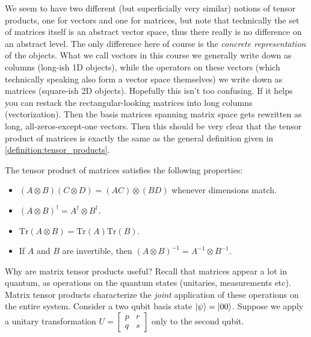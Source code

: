 \begin{remark}
    We seem to have two different (but superficially very similar) notions of tensor products, one for vectors and one for matrices, but note that technically the set of matrices itself is an abstract vector space, thus there really is no difference on an abstract level. The only difference here of course is the \textit{concrete representation} of the objects. What we call vectors in this course we generally write down as columns (long-ish 1D objects), while the operators on these vectors (which technically speaking also form a vector space themselves) we write down as matrices (square-ish 2D objects). Hopefully this isn't too confusing. If it helps you can restack the rectangular-looking matrices into long columns (vectorization). Then the basis matrices spanning matrix space gets rewritten as long, all-zeros-except-one vectors. Then this should be very clear that the tensor product of matrices is exactly the same as the general definition given in \cref{definition:tensor_products}.
\end{remark}
 

\begin{proposition}
The tensor product of matrices satisfies the following properties:
\begin{itemize}
    \item $(A \otimes B)(C \otimes D) = (AC) \otimes (BD)$ whenever dimensions match.
    \item $(A \otimes B)^\dagger = A^\dagger \otimes B^\dagger$.
    \item $\mathrm{Tr}(A \otimes B) = \mathrm{Tr}(A)\mathrm{Tr}(B)$.
    \item If $A$ and $B$ are invertible, then $(A \otimes B)^{-1} = A^{-1} \otimes B^{-1}$.
\end{itemize}
\end{proposition}

Why are matrix tensor products useful? Recall that matrices appear a lot in quantum, as operations on the quantum states (unitaries, measurements etc). Matrix tensor products characterize the \textit{joint} application of these operations on the entire system. Consider a two qubit basis state $\ket{\psi}=\ket{00}$. Suppose we apply a unitary transformation $U= \begin{bmatrix} p & r \\ q & s \end{bmatrix}$ only to the second qubit.

